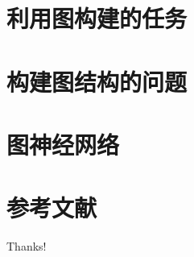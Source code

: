 \documentclass{beamer}
\begin{document}
\begin{frame}

\end{frame}


\section{利用图构建的任务}

\begin{frame}

\end{frame}

\section{构建图结构的问题}

\begin{frame}

\end{frame}

\section{图神经网络}

\begin{frame}

\end{frame}

\section{参考文献}

\begin{frame}[allowframebreaks]
    
    
\end{frame}

\begin{frame}
    \begin{center}
        {\Huge\calligra Thanks!}
    \end{center}
\end{frame}
\end{document}
